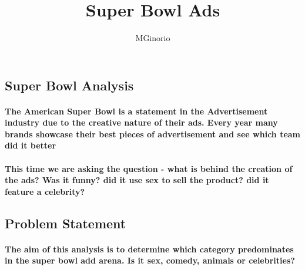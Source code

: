 \documentclass[
]{article}
\title{Super Bowl Ads}
\author{MGinorio}
\date{}
\begin{document}
\maketitle

\hypertarget{super-bowl-analysis}{%
\subsection{Super Bowl Analysis}\label{super-bowl-analysis}}

\hypertarget{the-american-super-bowl-is-a-statement-in-the-advertisement-industry-due-to-the-creative-nature-of-their-ads.-every-year-many-brands-showcase-their-best-pieces-of-advertisement-and-see-which-team-did-it-better}{%
\paragraph{The American Super Bowl is a statement in the Advertisement
industry due to the creative nature of their ads. Every year many brands
showcase their best pieces of advertisement and see which team did it
better}\label{the-american-super-bowl-is-a-statement-in-the-advertisement-industry-due-to-the-creative-nature-of-their-ads.-every-year-many-brands-showcase-their-best-pieces-of-advertisement-and-see-which-team-did-it-better}}

\hypertarget{this-time-we-are-asking-the-question---what-is-behind-the-creation-of-the-ads-was-it-funny-did-it-use-sex-to-sell-the-product-did-it-feature-a-celebrity}{%
\paragraph{This time we are asking the question - what is behind the
creation of the ads? Was it funny? did it use sex to sell the product?
did it feature a
celebrity?}\label{this-time-we-are-asking-the-question---what-is-behind-the-creation-of-the-ads-was-it-funny-did-it-use-sex-to-sell-the-product-did-it-feature-a-celebrity}}

\hypertarget{problem-statement}{%
\subsection{Problem Statement}\label{problem-statement}}

\hypertarget{the-aim-of-this-analysis-is-to-determine-which-category-predominates-in-the-super-bowl-add-arena.-is-it-sex-comedy-animals-or-celebrities}{%
\paragraph{The aim of this analysis is to determine which category
predominates in the super bowl add arena. Is it sex, comedy, animals or
celebrities?}\label{the-aim-of-this-analysis-is-to-determine-which-category-predominates-in-the-super-bowl-add-arena.-is-it-sex-comedy-animals-or-celebrities}}
\end{document}
